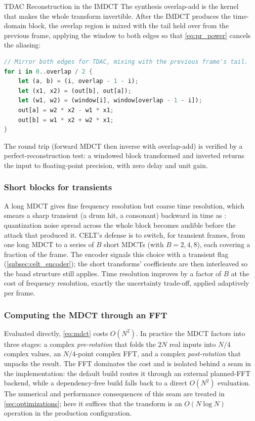 \begin{implementation}{TDAC Reconstruction in the IMDCT}
  The synthesis overlap-add is the kernel that makes the whole transform
  invertible. After the IMDCT produces the time-domain block, the overlap region
  is mixed with the tail held over from the previous frame, applying the window
  to both edges so that \cref{eq:pr_power} cancels the aliasing:
  \begin{lstlisting}[language=Rust]
// Mirror both edges for TDAC, mixing with the previous frame's tail.
for i in 0..overlap / 2 {
    let (a, b) = (i, overlap - 1 - i);
    let (x1, x2) = (out[b], out[a]);
    let (w1, w2) = (window[i], window[overlap - 1 - i]);
    out[a] = w2 * x2 - w1 * x1;
    out[b] = w1 * x2 + w2 * x1;
}
  \end{lstlisting}
  The round trip (forward MDCT then inverse with overlap-add) is verified by a
  perfect-reconstruction test: a windowed block transformed and inverted returns
  the input to floating-point precision, with zero delay and unit gain.
\end{implementation}

\subsubsection{Short blocks for transients}

A long MDCT gives fine frequency resolution but coarse time resolution, which
smears a sharp transient (a drum hit, a consonant) backward in time as
: quantization noise spread across the whole block becomes
audible before the attack that produced it. CELT's defense is to switch, for
transient frames, from one long MDCT to a series of $B$ short MDCTs (with $B =
2, 4, 8$), each covering a fraction of the frame. The encoder signals this choice
with a transient flag (\cref{subsec:celt_encoder}); the short transforms'
coefficients are then interleaved so the band structure still applies. Time
resolution improves by a factor of $B$ at the cost of frequency resolution,
exactly the uncertainty trade-off, applied adaptively per frame.

\subsubsection{Computing the MDCT through an FFT}

Evaluated directly, \cref{eq:mdct} costs $O(N^2)$. In practice the MDCT
factors into three stages: a complex \emph{pre-rotation} that folds the $2N$ real
inputs into $N/4$ complex values, an $N/4$-point complex FFT, and a complex
\emph{post-rotation} that unpacks the result. The FFT dominates the cost and is
isolated behind a seam in the implementation: the default build routes it
through an external planned-FFT backend, while a dependency-free build falls back
to a direct $O(N^2)$ evaluation. The numerical and performance consequences of
this seam are treated in \cref{sec:optimizations}; here it suffices that the
transform is an $O(N\log N)$ operation in the production configuration.

